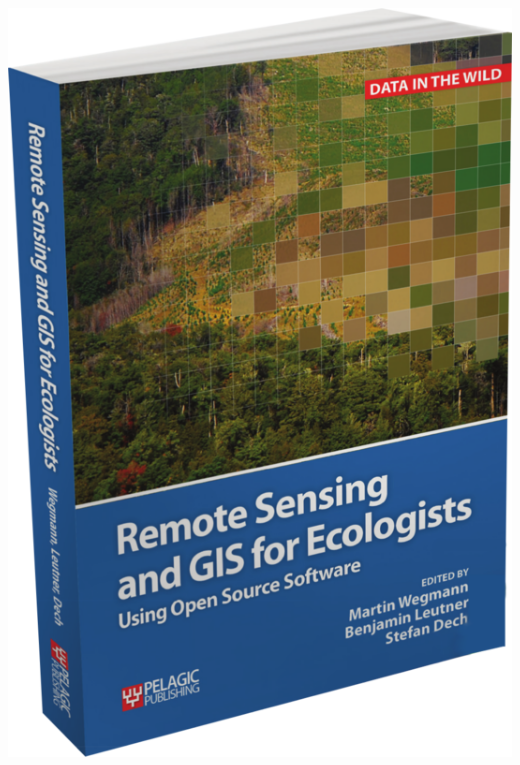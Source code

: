 \documentclass[10pt,landscape]{article}
\begin{document}
\begin{multicols}{3}
\bigskip

\bigskip



\begin{center}
 \includegraphics[width=.2\textwidth]{pics/RS_GIS_Ecology_book_wegmann_leutner_dech_book_ecosens_org_BookCover.png}
\end{center}



\end{multicols}
\end{document}

